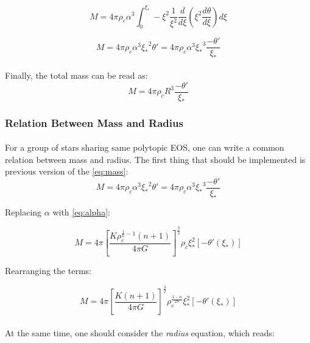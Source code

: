 \documentclass[letterpaper,12pt]{article}
\begin{document}
\begin{equation*}
    M =4 \pi \rho_c \alpha^3 \int_0^{\xi_*} -{\xi^2 \frac{1}{\xi^2}\frac{d}{d\xi}\left(\xi^2\frac{d\theta}{d\xi}\right) } d\xi
\end{equation*}

\begin{equation*}
    M = 4 \pi \rho_c \alpha^3 {\xi_*}^2 \theta' = 4 \pi \rho_c \alpha^3 {\xi_*}^3 \frac{-\theta'}{{\xi_*}}
\end{equation*}
\paragraph{} Finally, the total mass can be read as:
\begin{equation}
    \label{eq:mass}
\boxed{ M = 4 \pi \rho_c R^3 \frac{-\theta'}{{\xi_*}}}
\end{equation}


\subsubsection{Relation Between Mass and Radius}

\paragraph{} For a group of stars sharing same polytopic EOS, one can write a common relation between mass and radius. The first thing that should be implemented is previous version of the \eqref{eq:mass}:
\begin{equation*}
    M = 4 \pi \rho_c \alpha^3 {\xi_*}^2 \theta' = 4 \pi \rho_c \alpha^3 {\xi_*}^3 \frac{-\theta'}{{\xi_*}}
\end{equation*}

Replacing $\alpha$ with \eqref{eq:alpha}:

\begin{equation*}
    M = 4 \pi \left[\frac{K \rho_c^{\frac{1}{n}-1}\left(n+1\right)}{4 \pi G}\right]^{\frac{3}{2}} \rho_c \xi_*^2 \left[-\theta'(\xi_*)\right]
\end{equation*}

Rearranging the terms:

\begin{equation}
    \label{eq:mass2}
    M = 4 \pi \left[\frac{K\left(n+1\right)}{4 \pi G}\right]^{\frac{3}{2}} \rho_c^{\frac{3-n}{2n}} \xi_*^2 \left[-\theta'(\xi_*)\right]
\end{equation}

\paragraph{} At the same time, one should consider the \textit{radius} equation, which reads:
\end{document}
